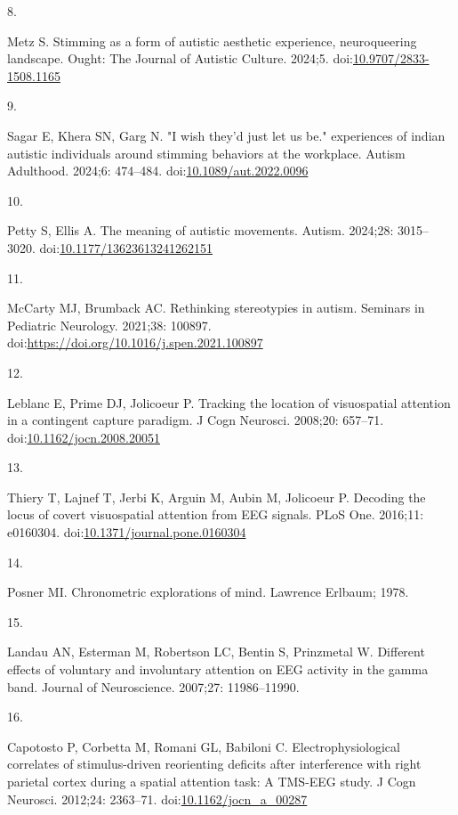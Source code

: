 \documentclass[
  letterpaper,
  DIV=11,
  numbers=noendperiod]{scrartcl}
\newlength{\cslhangindent}
\newlength{\csllabelwidth}
\newenvironment{CSLReferences}[2] %
 {\begin{list}{}{%
  \setlength{\itemindent}{0pt}
  \setlength{\leftmargin}{0pt}
  \setlength{\parsep}{0pt}
  \ifodd #1
   \setlength{\leftmargin}{\cslhangindent}
   \setlength{\itemindent}{-1\cslhangindent}
  \fi
  \setlength{\itemsep}{#2\baselineskip}}}
 {\end{list}}
\newcommand{\CSLLeftMargin}[1]{\parbox[t]{\csllabelwidth}{\strut#1\strut}}
\newcommand{\CSLRightInline}[1]{\parbox[t]{\linewidth - \csllabelwidth}{\strut#1\strut}}
\begin{document}
\begin{CSLReferences}{0}{1}
\CSLLeftMargin{8. }%
\CSLRightInline{Metz S. Stimming as a form of autistic aesthetic
experience, neuroqueering landscape. Ought: The Journal of Autistic
Culture. 2024;5.
doi:\href{https://doi.org/10.9707/2833-1508.1165}{10.9707/2833-1508.1165}}

\CSLLeftMargin{9. }%
\CSLRightInline{Sagar E, Khera SN, Garg N. "I wish they'd just let us
be." experiences of indian autistic individuals around stimming
behaviors at the workplace. Autism Adulthood. 2024;6: 474--484.
doi:\href{https://doi.org/10.1089/aut.2022.0096}{10.1089/aut.2022.0096}}

\CSLLeftMargin{10. }%
\CSLRightInline{Petty S, Ellis A. The meaning of autistic movements.
Autism. 2024;28: 3015--3020.
doi:\href{https://doi.org/10.1177/13623613241262151}{10.1177/13623613241262151}}

\CSLLeftMargin{11. }%
\CSLRightInline{McCarty MJ, Brumback AC. Rethinking stereotypies in
autism. Seminars in Pediatric Neurology. 2021;38: 100897.
doi:\url{https://doi.org/10.1016/j.spen.2021.100897}}

\CSLLeftMargin{12. }%
\CSLRightInline{Leblanc E, Prime DJ, Jolicoeur P. Tracking the location
of visuospatial attention in a contingent capture paradigm. J Cogn
Neurosci. 2008;20: 657--71.
doi:\href{https://doi.org/10.1162/jocn.2008.20051}{10.1162/jocn.2008.20051}}

\CSLLeftMargin{13. }%
\CSLRightInline{Thiery T, Lajnef T, Jerbi K, Arguin M, Aubin M,
Jolicoeur P. Decoding the locus of covert visuospatial attention from
EEG signals. PLoS One. 2016;11: e0160304.
doi:\href{https://doi.org/10.1371/journal.pone.0160304}{10.1371/journal.pone.0160304}}

\CSLLeftMargin{14. }%
\CSLRightInline{Posner MI. Chronometric explorations of mind. Lawrence
Erlbaum; 1978. }

\CSLLeftMargin{15. }%
\CSLRightInline{Landau AN, Esterman M, Robertson LC, Bentin S,
Prinzmetal W. Different effects of voluntary and involuntary attention
on EEG activity in the gamma band. Journal of Neuroscience. 2007;27:
11986--11990. }

\CSLLeftMargin{16. }%
\CSLRightInline{Capotosto P, Corbetta M, Romani GL, Babiloni C.
Electrophysiological correlates of stimulus-driven reorienting deficits
after interference with right parietal cortex during a spatial attention
task: A TMS-EEG study. J Cogn Neurosci. 2012;24: 2363--71.
doi:\href{https://doi.org/10.1162/jocn_a_00287}{10.1162/jocn\_a\_00287}}


\end{CSLReferences}
\end{document}
